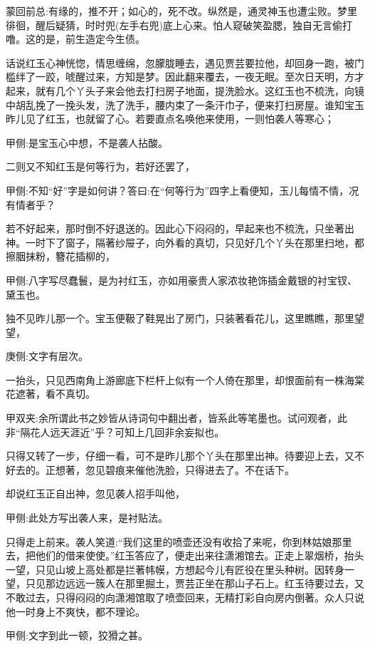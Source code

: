 

\begin{parag}
    \begin{note}蒙回前总:有缘的，推不开；如心的，死不改。纵然是，通灵神玉也遭尘败。梦里徘徊，醒后疑猜，时时兜(左手右兜)底上心来。怕人窥破笑盈腮，独自无言偷打噜。这的是，前生造定今生债。\end{note}
\end{parag}


\begin{parag}
    话说红玉心神恍惚，情思缠绵，忽朦胧睡去，遇见贾芸要拉他，却回身一跑，被门槛绊了一跤，唬醒过来，方知是梦。因此翻来覆去，一夜无眠。至次日天明，方才起来，就有几个丫头子来会他去打扫房子地面，提洗脸水。这红玉也不梳洗，向镜中胡乱挽了一挽头发，洗了洗手，腰内束了一条汗巾子，便来打扫房屋。谁知宝玉昨儿见了红玉，也就留了心。若要直点名唤他来使用，一则怕袭人等寒心；\begin{note}甲侧:是宝玉心中想，不是袭人拈酸。\end{note}二则又不知红玉是何等行为，若好还罢了，\begin{note}甲侧:不知“好”字是如何讲？答曰:在“何等行为”四字上看便知，玉儿每情不情，况有情者乎？\end{note}若不好起来，那时倒不好退送的。因此心下闷闷的，早起来也不梳洗，只坐著出神。一时下了窗子，隔著纱屉子，向外看的真切，只见好几个丫头在那里扫地，都擦胭抹粉，簪花插柳的，\begin{note}甲侧:八字写尽蠢鬟，是为衬红玉，亦如用豪贵人家浓妆艳饰插金戴银的衬宝钗、黛玉也。\end{note}独不见昨儿那一个。宝玉便靸了鞋晃出了房门，只装著看花儿，这里瞧瞧，那里望望，\begin{note}庚侧:文字有层次。\end{note}一抬头，只见西南角上游廊底下栏杆上似有一个人倚在那里，却恨面前有一株海棠花遮著，看不真切。\begin{note}甲双夹:余所谓此书之妙皆从诗词句中翻出者，皆系此等笔墨也。试问观者，此非“隔花人远天涯近”乎？可知上几回非余妄拟也。\end{note}只得又转了一步，仔细一看，可不是昨儿那个丫头在那里出神。待要迎上去，又不好去的。正想著，忽见碧痕来催他洗脸，只得进去了。不在话下。
\end{parag}


\begin{parag}
    却说红玉正自出神，忽见袭人招手叫他，\begin{note}甲侧:此处方写出袭人来，是衬贴法。\end{note}只得走上前来。袭人笑道:“我们这里的喷壶还没有收拾了来呢，你到林姑娘那里去，把他们的借来使使。”红玉答应了，便走出来往潇湘馆去。正走上翠烟桥，抬头一望，只见山坡上高处都是拦著帏幙，方想起今儿有匠役在里头种树。因转身一望，只见那边远远一簇人在那里掘土，贾芸正坐在那山子石上。红玉待要过去，又不敢过去，只得闷闷的向潇湘馆取了喷壶回来，无精打彩自向房内倒著。众人只说他一时身上不爽快，都不理论。\begin{note}甲侧:文字到此一顿，狡猾之甚。\end{note}
\end{parag}


